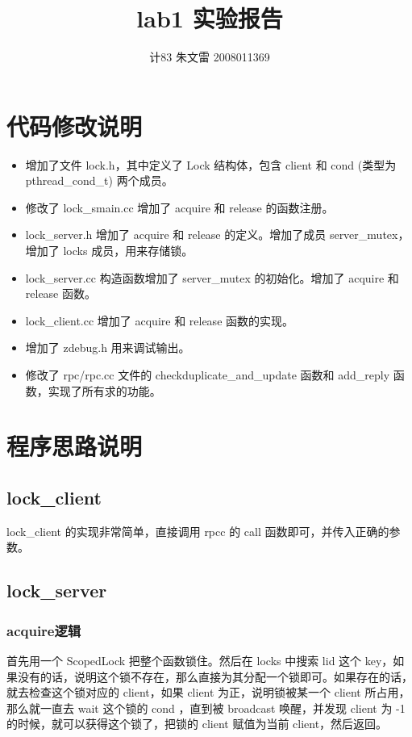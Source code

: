 \documentclass[10pt]{article}
\begin{document}
\begin{CJK}{UTF8}{gbsn}

\title{lab1 实验报告}
\author{计83{ }朱文雷{ }2008011369}
\maketitle

\section{代码修改说明}
\begin{itemize}
\item 增加了文件 lock.h，其中定义了 Lock 结构体，包含 client 和 cond (类型为 pthread\_cond\_t) 两个成员。
\item 修改了 lock\_smain.cc 增加了 acquire 和 release 的函数注册。
\item lock\_server.h 增加了 acquire 和 release 的定义。增加了成员 server\_mutex，增加了 locks 成员，用来存储锁。
\item lock\_server.cc 构造函数增加了 server\_mutex 的初始化。增加了 acquire 和 release 函数。
\item lock\_client.cc 增加了 acquire 和 release 函数的实现。
\item 增加了 zdebug.h 用来调试输出。
\item 修改了 rpc/rpc.cc 文件的 checkduplicate\_and\_update 函数和 add\_reply 函数，实现了所有求的功能。
\end{itemize}

\section{程序思路说明}
\subsection{lock\_client}
lock\_client 的实现非常简单，直接调用 rpcc 的 call 函数即可，并传入正确的参数。

\subsection{lock\_server}
\subsubsection{acquire逻辑}
首先用一个 ScopedLock 把整个函数锁住。然后在 locks 中搜索 lid 这个 key，如果没有的话，说明这个锁不存在，那么直接为其分配一个锁即可。如果存在的话，就去检查这个锁对应的 client，如果 client 为正，说明锁被某一个 client 所占用，那么就一直去 wait 这个锁的 cond ，直到被 broadcast 唤醒，并发现 client 为 -1的时候，就可以获得这个锁了，把锁的 client 赋值为当前 client，然后返回。


\end{CJK}
\end{document}
